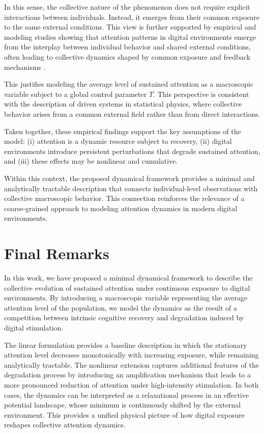 \documentclass[preprint,12pt]{elsarticle}
\begin{document}
In this sense, the collective nature of the phenomenon does not require explicit interactions between individuals. Instead, it emerges from their common exposure to the same external conditions. This view is further supported by empirical and modeling studies showing that attention patterns in digital environments emerge from the interplay between individual behavior and shared external conditions, often leading to collective dynamics shaped by common exposure and feedback mechanisms \cite{wagner,perra}.

This justifies modeling the average level of sustained attention as a macroscopic variable subject to a global control parameter $T$. This perspective is consistent with the description of driven systems in statistical physics, where collective behavior arises from a common external field rather than from direct interactions.


\vspace{0.5cm}

Taken together, these empirical findings support the key assumptions of the model: (i) attention is a dynamic resource subject to recovery, (ii) digital environments introduce persistent perturbations that degrade sustained attention, and (iii) these effects may be nonlinear and cumulative.

Within this context, the proposed dynamical framework provides a minimal and analytically tractable description that connects individual-level observations with collective macroscopic behavior. This connection reinforces the relevance of a coarse-grained approach to modeling attention dynamics in modern digital environments.






\section{Final Remarks}   

In this work, we have proposed a minimal dynamical framework to describe the collective evolution of sustained attention under continuous exposure to digital environments. By introducing a macroscopic variable representing the average attention level of the population, we model the dynamics as the result of a competition between intrinsic cognitive recovery and degradation induced by digital stimulation.

The linear formulation provides a baseline description in which the stationary attention level decreases monotonically with increasing exposure, while remaining analytically tractable. The nonlinear extension captures additional features of the degradation process by introducing an amplification mechanism that leads to a more pronounced reduction of attention under high-intensity stimulation. In both cases, the dynamics can be interpreted as a relaxational process in an effective potential landscape, whose minimum is continuously shifted by the external environment. This provides a unified physical picture of how digital exposure reshapes collective attention dynamics.
\end{document}
